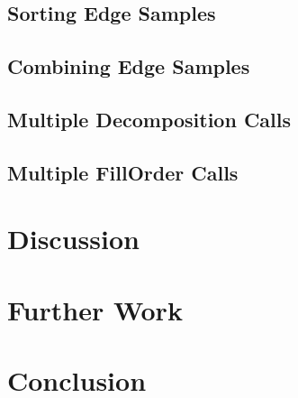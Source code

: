 \documentclass[12pt, a4paper]{article}
\begin{document}
\subsection{Sorting Edge Samples}

\subsection{Combining Edge Samples}

\subsection{Multiple Decomposition Calls}

\subsection{Multiple FillOrder Calls}

\section{Discussion}


\section{Further Work}

\section{Conclusion}
\end{document}
